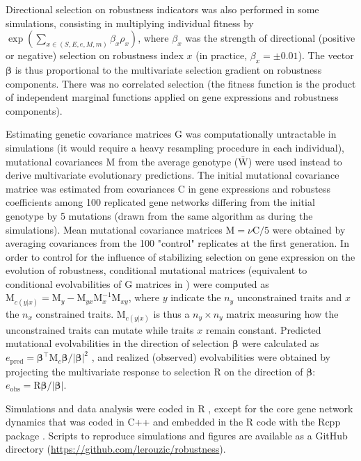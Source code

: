 \documentclass[10pt,a4paper]{article}
\begin{document}
Directional selection on robustness indicators was also performed in some simulations, consisting in multiplying individual fitness by $\exp ( \sum_{x \in (S, E, e, M, m)} \beta_x \rho _x )$, where $\beta_x$ was the strength of directional (positive or negative) selection on robustness index $x$ (in practice, $\beta_x= \pm 0.01$). The vector $\bm\beta$ is thus proportional to the multivariate selection gradient on robustness components. There was no correlated selection (the fitness function is the product of independent marginal functions applied on gene expressions and robustness components). 

Estimating genetic covariance matrices $\bm{\mathrm G}$ was computationally untractable in simulations (it would require a heavy resampling procedure in each individual), mutational covariances $\bm{\mathrm M}$ from the average genotype ($\bar{\bm{\mathrm W}}$) were used instead to derive multivariate evolutionary predictions. The initial mutational covariance matrice was estimated from covariances $\bm{\mathrm C}$ in gene expressions and robustess coefficients among 100 replicated gene networks differing from the initial genotype by 5 mutations (drawn from the same algorithm as during the simulations). Mean mutational covariance matrices $\bm{\mathrm M} = \nu \bm{\mathrm C}/5$ were obtained by averaging covariances from the 100 "control" replicates at the first generation. In order to control for the influence of stabilizing selection on gene expression on the evolution of robustness, conditional mutational matrices (equivalent to conditional evolvabilities of $ \bm{\mathrm G}$ matrices in \cite{HH08}) were computed as $\bm{\mathrm  M}_{c(y|x)} =\bm{\mathrm M}_y - \bm{\mathrm M}_{yx} \bm{\mathrm M}_x^{-1} \bm{\mathrm M}_{xy}$, where $y$ indicate the $n_y$ unconstrained traits and $x$ the $n_x$ constrained traits. $\bm{\mathrm M}_{c(y|x)}$ is thus a $n_y \times n_y$ matrix measuring how the unconstrained traits can mutate while traits $x$ remain constant. Predicted mutational evolvabilities in the direction of selection $\bm \beta$ were calculated as $e_\mathrm{pred} = \bm\beta^\top \bm{\mathrm M}_c \bm\beta / |\bm\beta|^2$ \citep{HH08}, and realized (observed) evolvabilities were obtained by projecting the multivariate response to selection $\bm{\mathrm R}$ on the direction of $\bm\beta$: $e_\mathrm{obs} = \bm{\mathrm R} \bm\beta / |\bm\beta|$. 

Simulations and data analysis were coded in R \citep{R20}, except for the core gene network dynamics that was coded in C++ and embedded in the R code with the Rcpp package \citep{EF11}. Scripts to reproduce simulations and figures are available as a GitHub directory (\url{https://github.com/lerouzic/robustness}). 
\end{document}
